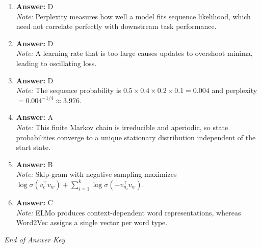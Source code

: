 \documentclass[12pt]{article}
\begin{document}
\begin{enumerate}[label=Q\arabic*.]
 \item \textbf{Answer:} D \\
 \textit{Note:} Perplexity measures how well a model fits sequence likelihood, which need not correlate perfectly with downstream task performance.
 
 \item \textbf{Answer:} D \\
 \textit{Note:} A learning rate that is too large causes updates to overshoot minima, leading to oscillating loss.
 
 \item \textbf{Answer:} D \\
 \textit{Note:} The sequence probability is $0.5 \times 0.4 \times 0.2 \times 0.1 = 0.004$ and perplexity $= 0.004^{-1/4} \approx 3.976$.
 
 \item \textbf{Answer:} A \\
 \textit{Note:} This finite Markov chain is irreducible and aperiodic, so state probabilities converge to a unique stationary distribution independent of the start state.
 
 \item \textbf{Answer:} B \\
 \textit{Note:} Skip-gram with negative sampling maximizes $\log \sigma(v_c^\top v_w) + \sum_{i=1}^{k} \log \sigma(-v_{n_i}^\top v_w)$.
 
 \item \textbf{Answer:} C \\
 \textit{Note:} ELMo produces context-dependent word representations, whereas Word2Vec assigns a single vector per word type.
 
 \end{enumerate}
 
 \vfill
 \noindent\textit{End of Answer Key}
 
 
\end{document}
